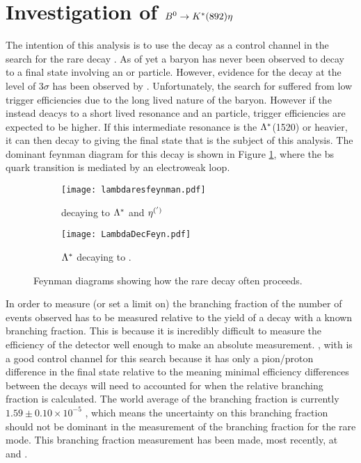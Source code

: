 \section{Investigation of ${{B}^0} \rightarrow {\ensuremath{{K}^*}}(892) \eta$}
\label{sec:Analysis}
The intention of this analysis is to use the decay \Bd \to \Kstar \etaz as a control channel in the search for the rare decay \Lb \to \proton \Km \etaz.  As of yet a \Lb baryon has never been observed to decay to a final state involving an \etapr or \etaz particle.  However, evidence for the decay \Lb \to \Lz\etaz at the level of $3\sigma$ has been observed by \lhcb \cite{LHCb-PAPER-2015-019}. Unfortunately, the search for \Lb \to \Lz \etaz suffered from low trigger efficiencies due to the long lived nature of the \Lz baryon. However if the \Lb instead deacys to a short lived \Lz resonance and an \etaz particle, trigger efficiencies are expected to be higher.  If this intermediate resonance is the ${\Lambda}^{*}$(1520) or heavier, it can then decay to \proton \Km giving the final state that is the subject of this analysis.  The dominant feynman diagram for this decay is shown in Figure \ref{fig:Initial}, where the b\to s quark transition is mediated by an electroweak loop.
\begin{figure}[h]
  \centering
  \begin{subfigure}[b]{0.49\textwidth}
    \texttt{[image: lambdaresfeynman.pdf]}
    \caption{ \Lb decaying to ${\Lambda}^{*}$ and $\eta^{(')}$ }
    \label{fig:Initial}
  \end{subfigure}
  \begin{subfigure}[b]{0.49\textwidth}
    \texttt{[image: LambdaDecFeyn.pdf]}
    \caption{${\Lambda}^{*}$ decaying to \proton \Km.}
    \label{fig:next}
  \end{subfigure}
  \label{fig:feynman}
  \caption{Feynman diagrams showing how the rare decay often proceeds.}
  \end{figure}

In order to measure (or set a limit on) the branching fraction of \Lb \to \proton \Km the number of events observed has to be measured relative to the yield of a decay with a known branching fraction.  This is because it is incredibly difficult to measure the efficiency of the detector well enough to make an absolute measurement.  \Bd \to \Kstar \etaz, with \Kstar \to \Kp \pim is a good control channel for this search because it has only a pion/proton difference in the final state relative to the \Lb \to \proton \Km \etaz meaning minimal efficiency differences between the decays will need to accounted for when the relative branching fraction is calculated.  The world average of the branching fraction is currently $1.59\pm0.10 \times10^{-5}$ \cite{PDG2014}, which means the uncertainty on this branching fraction should not be dominant in the measurement of the branching fraction for the rare mode.  This branching fraction measurement has been made, most recently, at  \babar and \belle\cite{Wang:2007rzb,Aubert:2006fj}.

